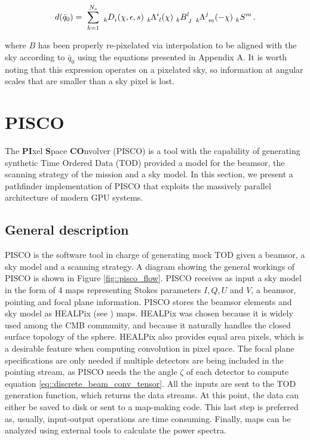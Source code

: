 \documentclass[a4paper,11pt]{article}
\begin{document}
\begin{equation}
\begin{aligned}
d(\bar{q}_0) = \
\sum_{k=1}^{N_s} \
\tensor[_k]{D}{_{i}}(\chi,\epsilon,s) \
\tensor[_k]{\Lambda}{^{i}_{l}}(\chi) \
\tensor[_k]{B}{^l_j} \
\tensor[_k]{\Lambda}{^{j}_{m}}(-\chi) \
\tensor[_k]{S}{^m}  \, \rm{.}
\end{aligned}
\label{eq::discrete_beam_conv_tensor}
\end{equation}

\noindent
where $B$ has been properly re-pixelated via interpolation to be aligned with the sky according to $\bar{q}_0$ using the equations presented in Appendix A. It is worth noting that this expression operates on a pixelated sky, so information at angular scales that are smaller than a sky pixel is lost.

\section{PISCO}
\label{sec::pisco}

The \textbf{PI}xel \textbf{S}pace \textbf{CO}nvolver (PISCO) is a tool with the capability of generating synthetic Time Ordered Data (TOD) provided a model for the beamsor, the scanning strategy of the mission and a sky model. In this section, we present a pathfinder implementation of PISCO that exploits the massively parallel architecture of modern GPU systems.

\subsection{General description}

PISCO is the software tool in charge of generating mock TOD given a beamsor, a sky model and a scanning strategy. A diagram showing the general workings of PISCO is shown in Figure \ref{fig::pisco_flow}. PISCO receives as input a sky model in the form of 4 maps representing Stokes parameters $I,Q,U$ and $V$, a beamsor, pointing and focal plane information. PISCO stores the beamsor elements and sky model as HEALPix (see \cite{2005ApJ...622..759G}) maps. HEALPix was chosen because it is widely used among the CMB community, and because it naturally handles the closed surface topology of the sphere. HEALPix also provides equal area pixels, which is a desirable feature when computing convolution in pixel space. The focal plane specifications are only needed if multiple detectors are being included in the pointing stream, as PISCO needs the the angle $\zeta$ of each detector to compute equation \ref{eq::discrete_beam_conv_tensor}. All the inputs are sent to the TOD generation function, which returns the data streams. At this point, the data can either be saved to disk or sent to a map-making code. This last step is preferred as, usually, input-output operations are time consuming. Finally, maps can be analyzed using external tools to calculate the power spectra.
\end{document}
